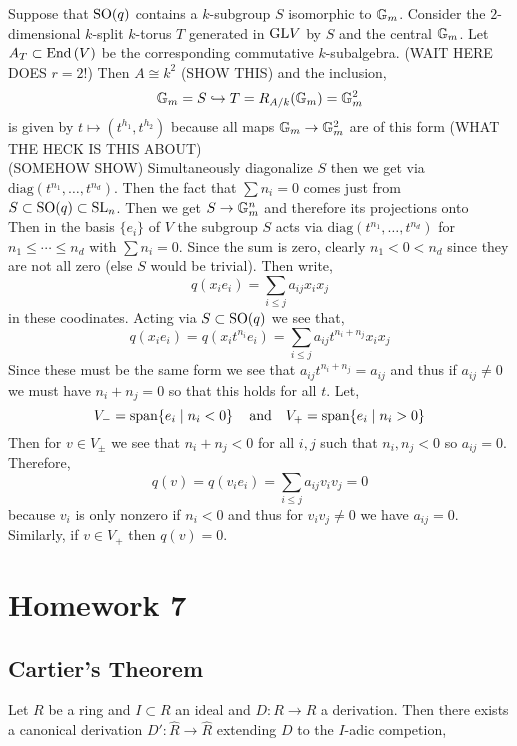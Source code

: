 \documentclass[12pt]{article}
\begin{document}
Suppose that $\mathrm{SO}(q)$ contains a $k$-subgroup $S$ isomorphic to $\mathbb{G}_m$. Consider the $2$-dimensional $k$-split $k$-torus $T$ generated in $\mathrm{GL}{V}$ by $S$ and the central $\mathbb{G}_m$. Let $A_T \subset \mathrm{End}\left( V \right)$ be the corresponding commutative $k$-subalgebra. (WAIT HERE DOES $r = 2$!)  Then $A \cong k^2$ (SHOW THIS) and the inclusion,
\[ \mathbb{G}_m = S \hookrightarrow T = R_{A/k}(\mathbb{G}_m) = \mathbb{G}_m^2 \]
is given by $t \mapsto (t^{h_1}, t^{h_2})$ because all maps $\mathbb{G}_m \to \mathbb{G}_m^2$ are of this form (WHAT THE HECK IS THIS ABOUT)
\bigskip\\
(SOMEHOW SHOW) 
Simultaneously diagonalize $S$ then we get via $\mathrm{diag}(t^{n_1}, \dots, t^{n_d})$. Then the fact that $\sum n_i = 0$ comes just from $S \subset \mathrm{SO}(q) \subset \mathrm{SL}_n$. Then we get $S \to \mathbb{G}_m^n$ and therefore its projections onto 
\bigskip\\
Then in the basis $\{ e_i \}$ of $V$ the subgroup $S$ acts via $\mathrm{diag}(t^{n_1}, \dots, t^{n_d})$ for $n_1 \le \cdots \le n_d$ with $\sum n_i = 0$. Since the sum is zero, clearly $n_1 < 0 < n_d$ since they are not all zero (else $S$ would be trivial). Then write,
\[ q(x_i e_i)  = \sum_{i \le j} a_{ij} x_i x_j \]
in these coodinates. Acting via $S \subset \mathrm{SO}(q)$ we see that,
\[ q(x_i e_i) = q(x_i t^{n_i} e_i) = \sum_{i \le j} a_{ij} t^{n_i + n_j} x_i x_j \]
Since these must be the same form we see that $a_{ij} t^{n_i + n_j} = a_{ij}$ and thus if $a_{ij} \neq 0$ we must have $n_i + n_j = 0$ so that this holds for all $t$. Let,
\[ V_{-} = \mathrm{span}\! \left\{e_i \mid n_i < 0 \right\} \quad \text{and} \quad V_+ = \mathrm{span}\! \left\{e_i \mid n_i > 0 \right\} \]
Then for $v \in V_{\pm}$ we see that $n_i + n_j < 0$ for all $i,j$ such that $n_i, n_j < 0$ so $a_{ij} = 0$. Therefore, 
\[ q(v) = q(v_i e_i) = \sum_{i \le j} a_{ij} v_i v_j = 0 \]
because $v_i$ is only nonzero if $n_i < 0$ and thus for $v_i v_j \neq 0$ we have $a_{ij} = 0$. Similarly, if $v \in V_+$ then $q(v) = 0$.

\section{Homework 7}

\subsection*{Cartier's Theorem}

\begin{lemma}
Let $R$ be a ring and $I \subset R$ an ideal and $D : R \to R$ a derivation. Then there exists a canonical derivation $D' : \widehat{R} \to \widehat{R}$ extending $D$ to the $I$-adic competion,
\begin{center}
\end{center}
\end{lemma}
\end{document}
